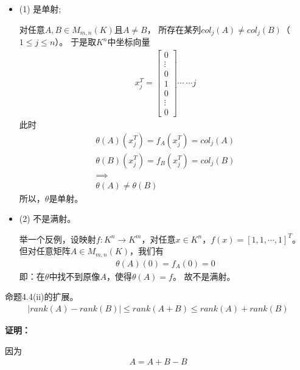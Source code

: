 \documentclass{article}
\begin{document}
\begin{itemize}
  \item (1) 是单射;

        对任意$A, B \in M_{m,n}(K)$且$A \neq B$，
        所存在某列$col_j(A) \neq col_j(B)$（$1 \leq j \leq n$）。
        于是取$K^n$中坐标向量
        \begin{align*}
          x_j^T = \begin{bmatrix}
                    0      \\
                    \vdots \\
                    0      \\
                    1      \\
                    0      \\
                    \vdots
                    \\ 0
                  \end{bmatrix}
          \cdots \ \cdots j
        \end{align*}
        此时
        \begin{align*}
          \theta(A)(x_j^T) = f_A(x_j^T) = col_j(A) \\
          \theta(B)(x_j^T) = f_B(x_j^T) = col_j(B) \\
          \implies                                 \\
          \theta(A) \neq \theta(B)
        \end{align*}
        所以，$\theta$是单射。
  \item (2) 不是满射。

        举一个反例，设映射$f: K^n \to K^m $，对任意$x \in K^n$，$f(x) = [1, 1, \cdots, 1]^T$。
        但对任意矩阵$A \in M_{m,n}(K)$，我们有
        \begin{align*}
          \theta(A)(0) = f_A(0) = 0
        \end{align*}
        即：在$\theta$中找不到原像$A$，使得$\theta(A) = f$。
        故不是满射。
\end{itemize}


\begin{zremark}
  命题4.4(ii)的扩展。
  \begin{align*}
    |rank(A) - rank(B)| \leq rank(A + B) \leq rank(A) + rank(B)
  \end{align*}
\end{zremark}

\textbf{证明：}

因为
\begin{align*}
  A = A + B - B
\end{align*}
\end{document}
